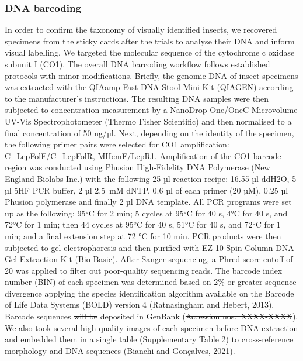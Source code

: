 \documentclass[12pt]{article}
\providecommand{\DIFaddtex}[1]{{\protect\color{blue}\uwave{#1}}} %
\providecommand{\DIFdeltex}[1]{{\protect\color{red}\sout{#1}}}                      %
\providecommand{\DIFaddbegin}{} %
\providecommand{\DIFaddend}{} %
\providecommand{\DIFdelbegin}{} %
\providecommand{\DIFdelend}{} %
\providecommand{\DIFadd}[1]{\texorpdfstring{\DIFaddtex{#1}}{#1}} %
\providecommand{\DIFdel}[1]{\texorpdfstring{\DIFdeltex{#1}}{}} %
\newcommand{\DIFscaledelfig}{0.5}
\newlength{\DIFdelgraphicswidth} %
\newlength{\DIFdelgraphicsheight} %
\newcommand{\DIFaddincludegraphics}[2][]{{\color{blue}\fbox{\DIFOincludegraphics[#1]{#2}}}} %
\newcommand{\DIFdelincludegraphics}[2][]{%
\sbox{\DIFdelgraphicsbox}{\DIFOincludegraphics[#1]{#2}}%
\settoboxwidth{\DIFdelgraphicswidth}{\DIFdelgraphicsbox} %
\settoboxtotalheight{\DIFdelgraphicsheight}{\DIFdelgraphicsbox} %
\scalebox{\DIFscaledelfig}{%
\parbox[b]{\DIFdelgraphicswidth}{\usebox{\DIFdelgraphicsbox}\\[-\baselineskip] \rule{\DIFdelgraphicswidth}{0em}}\llap{\resizebox{\DIFdelgraphicswidth}{\DIFdelgraphicsheight}{%
\setlength{\unitlength}{\DIFdelgraphicswidth}%
\begin{picture}(1,1)%
\thicklines\linethickness{2pt} %
{\color[rgb]{1,0,0}\put(0,0){\framebox(1,1){}}}%
{\color[rgb]{1,0,0}\put(0,0){\line( 1,1){1}}}%
{\color[rgb]{1,0,0}\put(0,1){\line(1,-1){1}}}%
\end{picture}%
}\hspace*{3pt}}} %
} %
\DeclareRobustCommand{\DIFaddbegin}{\DIFOaddbegin \let\includegraphics\DIFaddincludegraphics} %
\DeclareRobustCommand{\DIFaddend}{\DIFOaddend \let\includegraphics\DIFOincludegraphics} %
\DeclareRobustCommand{\DIFdelbegin}{\DIFOdelbegin \let\includegraphics\DIFdelincludegraphics} %
\DeclareRobustCommand{\DIFdelend}{\DIFOaddend \let\includegraphics\DIFOincludegraphics} %
\begin{document}
\begin{linenumbers}
		\subsubsection*{DNA barcoding}
		In order to confirm the taxonomy of visually identified insects, we recovered specimens from the sticky cards after the trials to analyse their DNA and inform visual labelling. We targeted the molecular sequence of the cytochrome c oxidase subunit I (CO1). The overall DNA barcoding workflow follows established protocols\cite{dewaard_expedited_2018} with minor modifications. Briefly, the genomic DNA of insect specimens was extracted with the QIAamp Fast DNA Stool Mini Kit (QIAGEN) according to the manufacturer’s instructions. The resulting DNA samples were then subjected to concentration measurement by a NanoDrop One/OneC Microvolume UV-Vis Spectrophotometer (Thermo Fisher Scientific) and then normalised to a final concentration of 50 ng/µl. Next, depending on the identity of the specimen, the following primer pairs were selected for CO1 amplification: C\_LepFolF/C\_LepFolR\cite{hernandeztriana_recovery_2014}, MHemF/LepR1\cite{park_barcoding_2011}. Amplification of the CO1 barcode region was conducted using Phusion High-Fidelity DNA Polymerase (New England Biolabs Inc.) with the following 25 µl reaction recipe: 16.55 µl ddH2O, 5 µl 5HF PCR buffer, 2 µl 2.5~mM dNTP, 0.6 µl of each primer (20 µM), 0.25 µl Phusion polymerase and finally 2 µl DNA template. All PCR programs were set up as the following: 95°C for 2 min; 5 cycles at 95°C for 40 s, 4°C for 40 s, and 72°C for 1 min; then 44 cycles at 95°C for 40 s, 51°C for 40 s, and 72°C for 1 min; and a final extension step at 72 °C for 10 min. PCR products were then subjected to gel electrophoresis and then purified with EZ-10 Spin Column DNA Gel Extraction Kit (Bio Basic). After Sanger sequencing, a Phred score cutoff of 20 was applied to filter out poor-quality sequencing reads. 
		The barcode index number (BIN) of each specimen was determined based on 2\% or greater sequence divergence applying the species identification algorithm available on the Barcode of Life Data Systems (BOLD) version 4 (Ratnasingham and Hebert, 2013). Barcode sequences \DIFdelbegin \DIFdel{will be }\DIFdelend \DIFaddbegin \DIFadd{were }\DIFaddend deposited in GenBank (\DIFdelbegin \DIFdel{Accession nos.~XXXX-XXXX}\DIFdelend \DIFaddbegin \DIFadd{accession number SUB11480448}\DIFaddend ). We also took several high-quality images of each specimen before DNA extraction and embedded them in a single table (Supplementary Table 2) to cross-reference morphology and DNA sequences (Bianchi and Gonçalves, 2021).


\end{linenumbers}
\end{document}
